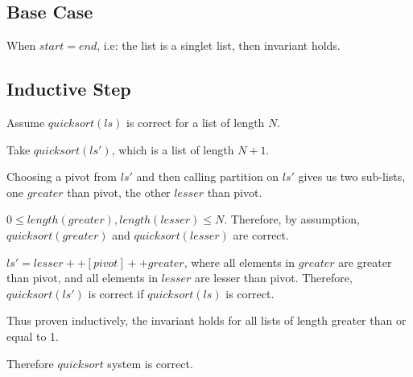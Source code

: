 \documentclass[12pt]{article}
\begin{document}
\subsection{Base Case}

When $start = end$, i.e: the list is a singlet list, then invariant holds.

\subsection{Inductive Step}

Assume $quicksort(ls)$ is correct for a list of length $N$.

Take $quicksort(ls')$, which is a list of length $N + 1$.

Choosing a pivot from $ls'$ and then calling partition on $ls'$ gives us two sub-lists, one $greater$ than pivot, the other $lesser$ than pivot.

$0 \leq length(greater), length(lesser) \leq N$. Therefore, by assumption, $quicksort(greater)$ and $quicksort(lesser)$ are correct.

$ls' = lesser ++ [pivot] ++ greater$, where all elements in $greater$ are greater than pivot, and all elements in $lesser$ are lesser than pivot. Therefore, $quicksort(ls')$ is correct if $quicksort(ls)$ is correct.

Thus proven inductively, the invariant holds for all lists of length greater than or equal to 1.

Therefore $quicksort$ system is correct.


 
\end{document}
